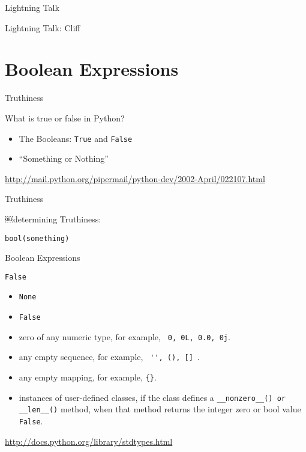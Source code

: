 \documentclass{beamer}
\begin{document}
\begin{frame}{Lightning Talk}

{\LARGE Lightning Talk: Cliff  }
\end{frame}


\section{Boolean Expressions}

\begin{frame}[fragile]{Truthiness}

{\Large What is true or false in Python?}

\begin{itemize}
  \item The Booleans: \verb+True+ and \verb+False+
  \item ``Something or Nothing''
\end{itemize}

{\small \url{http://mail.python.org/pipermail/python-dev/2002-April/022107.html} }

\end{frame}

\begin{frame}[fragile]{Truthiness}

{\Large ￼determining Truthiness:

\vfill
  \verb+bool(something)+
\vfill
}

\end{frame}

\begin{frame}[fragile]{Boolean Expressions}

{\Large \verb+False+ }

\begin{itemize}
  \item \verb+None+
  \item \verb+False+
  \item zero of any numeric type, for example, \verb+ 0, 0L, 0.0, 0j+.
  \item any empty sequence, for example, \verb+ '', (), [] +.
  \item any empty mapping, for example, \verb+{}+.
  \item instances of user-defined classes, if the class defines a
        \verb+__nonzero__() or __len__()+ method, when that method
        returns the integer zero or bool value \verb+False+.
\end{itemize}

\url{http://docs.python.org/library/stdtypes.html}

\end{frame}
\end{document}
